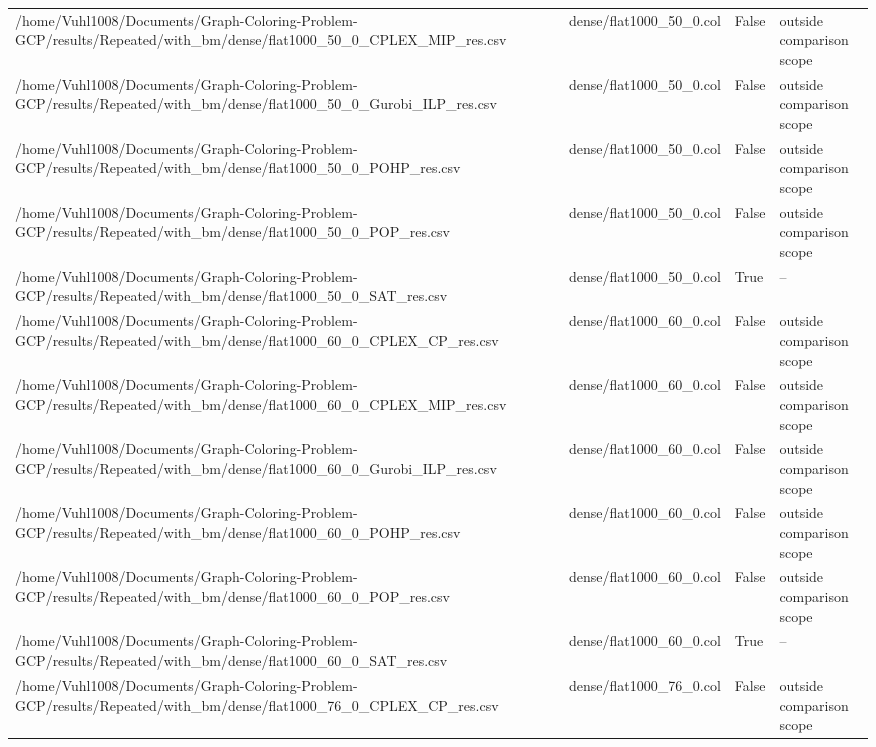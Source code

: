 \begin{table}[htbp]
\begin{tabular}{llll}
/home/Vuhl1008/Documents/Graph-Coloring-Problem-GCP/results/Repeated/with\_bm/dense/flat1000\_50\_0\_CPLEX\_MIP\_res.csv & dense/flat1000\_50\_0.col & False & outside comparison scope \\
/home/Vuhl1008/Documents/Graph-Coloring-Problem-GCP/results/Repeated/with\_bm/dense/flat1000\_50\_0\_Gurobi\_ILP\_res.csv & dense/flat1000\_50\_0.col & False & outside comparison scope \\
/home/Vuhl1008/Documents/Graph-Coloring-Problem-GCP/results/Repeated/with\_bm/dense/flat1000\_50\_0\_POHP\_res.csv & dense/flat1000\_50\_0.col & False & outside comparison scope \\
/home/Vuhl1008/Documents/Graph-Coloring-Problem-GCP/results/Repeated/with\_bm/dense/flat1000\_50\_0\_POP\_res.csv & dense/flat1000\_50\_0.col & False & outside comparison scope \\
/home/Vuhl1008/Documents/Graph-Coloring-Problem-GCP/results/Repeated/with\_bm/dense/flat1000\_50\_0\_SAT\_res.csv & dense/flat1000\_50\_0.col & True & -- \\
/home/Vuhl1008/Documents/Graph-Coloring-Problem-GCP/results/Repeated/with\_bm/dense/flat1000\_60\_0\_CPLEX\_CP\_res.csv & dense/flat1000\_60\_0.col & False & outside comparison scope \\
/home/Vuhl1008/Documents/Graph-Coloring-Problem-GCP/results/Repeated/with\_bm/dense/flat1000\_60\_0\_CPLEX\_MIP\_res.csv & dense/flat1000\_60\_0.col & False & outside comparison scope \\
/home/Vuhl1008/Documents/Graph-Coloring-Problem-GCP/results/Repeated/with\_bm/dense/flat1000\_60\_0\_Gurobi\_ILP\_res.csv & dense/flat1000\_60\_0.col & False & outside comparison scope \\
/home/Vuhl1008/Documents/Graph-Coloring-Problem-GCP/results/Repeated/with\_bm/dense/flat1000\_60\_0\_POHP\_res.csv & dense/flat1000\_60\_0.col & False & outside comparison scope \\
/home/Vuhl1008/Documents/Graph-Coloring-Problem-GCP/results/Repeated/with\_bm/dense/flat1000\_60\_0\_POP\_res.csv & dense/flat1000\_60\_0.col & False & outside comparison scope \\
/home/Vuhl1008/Documents/Graph-Coloring-Problem-GCP/results/Repeated/with\_bm/dense/flat1000\_60\_0\_SAT\_res.csv & dense/flat1000\_60\_0.col & True & -- \\
/home/Vuhl1008/Documents/Graph-Coloring-Problem-GCP/results/Repeated/with\_bm/dense/flat1000\_76\_0\_CPLEX\_CP\_res.csv & dense/flat1000\_76\_0.col & False & outside comparison scope \\

\end{tabular}
\end{table}
